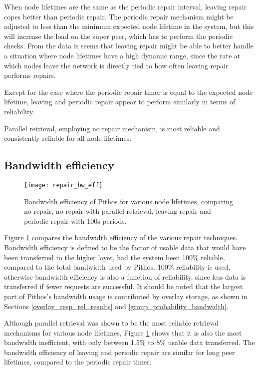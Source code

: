 When node lifetimes are the same as the periodic repair interval, leaving repair copes better than periodic repair. The periodic repair mechanism might be adjusted to less than the minimum expected node lifetime in the system, but this will increase the load on the super peer, which has to perform the periodic checks. From the data is seems that leaving repair might be able to better handle a situation where node lifetimes have a high dynamic range, since the rate at which nodes leave the network is directly tied to how often leaving repair performs repairs.

Except for the case where the periodic repair timer is equal to the expected node lifetime, leaving and periodic repair appear to perform similarly in terms of reliability.

Parallel retrieval, employing no repair mechanism, is most reliable and consistently reliable for all node lifetimes.

\subsection{Bandwidth efficiency}

\begin{figure}[htbp]
 \centering
 \texttt{[image: repair\_bw\_eff]}
 \caption{Bandwidth efficiency of Pithos for various node lifetimes, comparing no repair, no repair with parallel retrieval, leaving repair and periodic repair with 100s periods.}
 \label{fig_repair_bw_eff}
\end{figure}
%
Figure \ref{fig_repair_bw_eff} compares the bandwidth efficiency of the various repair techniques. Bandwidth efficiency is defined to be the factor of usable data that would have been transferred to the higher layer, had the system been 100\% reliable, compared to the total bandwidth used by Pithos. 100\% reliability is used, otherwise bandwidth efficiency is also a function of reliability, since less data is transferred if fewer requests are successful. It should be noted that the largest part of Pithos's bandwidth usage is contributed by overlay storage, as shown in Sections \ref{overlay_resp_rel_results} and \ref{group_probability_bandwidth}.

Although parallel retrieval was shown to be the most reliable retrieval mechanisms for various node lifetimes, Figure \ref{fig_repair_bw_eff} shows that it is also the most bandwidth inefficient, with only between 1.5\% to 8\% usable data transferred. The bandwidth efficiency of leaving and periodic repair are similar for long peer lifetimes, compared to the periodic repair timer.

